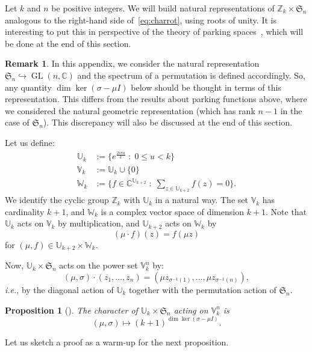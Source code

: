 \documentclass[11pt]{article}
\newtheorem{prop}[theo]{Proposition}
\theoremstyle{definition}
\newtheorem{rema}[theo]{Remark}
\newcommand{\bU}{\mathbb{U}}
\newcommand{\bV}{\mathbb{V}}
\newcommand{\bW}{\mathbb{W}}
\begin{document}
Let $k$ and $n$ be positive integers.  We will build natural representations of $\mathbb{Z}_k \times \mathfrak{S}_n$ analogous to the right-hand side of~\eqref{eq:charrot}, using roots of unity.  It is interesting to put this in perspective of the theory of parking spaces~\cite{armstrongreinerrhoades}, which will be done at the end of this section.

\begin{rema}
    In this appendix, we consider the natural representation $\mathfrak{S}_n \hookrightarrow \operatorname{GL}(n,\mathbb{C})$ and the spectrum of a permutation is defined accordingly.  So, any quantity $\dim\ker(\sigma-\mu I)$ below should be thought in terms of this representation.  This differs from the results about parking functions above, where we considered the natural geometric representation (which has rank $n-1$ in the case of $\mathfrak{S}_n$).  This discrepancy will also be discussed at the end of this section.
\end{rema}

Let us define:
\begin{align*}
    \bU_k &:= \bigg\{ e^\frac{2i\pi u}{k} \; : \; 0\leq u <k  \bigg\}  \\[2mm]
    \bV_k &:= \bU_k \cup \{0\} \\[2mm]
    \bW_k &:= \bigg\{ f \in \mathbb{C}^{\bU_{k+2}} \;:\; \sum_{z \in \bU_{k+2}} f(z) = 0 \bigg\}.
\end{align*}
We identify the cyclic group $\mathbb{Z}_k$ with $\mathbb{U}_k$ in a natural way.  The set $\bV_k$ has cardinality $k+1$, and $\bW_k$ is a complex vector space of dimension $k+1$.  Note that $\bU_k$ acts on $\bV_k$ by multiplication, and $\bU_{k+2}$ acts on $\bW_k$ by
\[
    (\mu \cdot f)(z) = f(\mu z)
\]
for $(\mu,f) \in \bU_{k+2} \times \bW_k $. 

Now, $\bU_k \times \mathfrak{S}_n$ acts on the power set $\bV_k^n$ by:
\[
    (\mu,\sigma) \cdot ( z_1, \dots, z_n) 
        =
    ( \mu z_{\sigma^{-1}(1)}, \dots, \mu z_{\sigma^{-1}(n)}),
\]
{\it i.e.}, by the diagonal action of $\bU_k$ together with the permutation action of $\mathfrak{S}_n$.  

\begin{prop}[{\cite[Section~6.2]{armstrongreinerrhoades}}]
    The character of $\bU_k \times \mathfrak{S}_n$ acting on $\bV_k^n$ is 
    \[
        (\mu,\sigma) \mapsto (k+1)^{\dim\ker(\sigma - \mu I)}.
    \]
\end{prop}

Let us sketch a proof as a warm-up for the next proposition.
\end{document}
